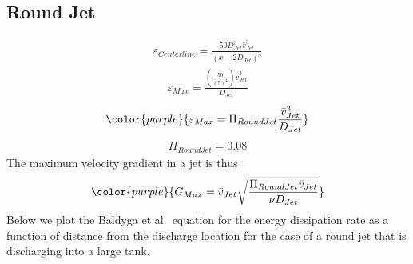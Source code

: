 \documentclass[letterpaper,10pt,english]{sphinxmanual}
\begin{document}
\subsection{Round Jet}
\label{\detokenize{Rapid_Mix/RM_Derivations:round-jet}}\label{\detokenize{Rapid_Mix/RM_Derivations:heading-round-jet}}
\begin{equation}\label{equation:Rapid_Mix/RM_Derivations:Rapid_Mix/RM_Derivations:87}
\begin{split}\varepsilon_{Centerline} = \frac{50 D_{Jet}^3 \bar v_{Jet}^3}{ \left( x - 2 D_{Jet} \right)^4}\end{split}
\end{equation}\begin{equation}\label{equation:Rapid_Mix/RM_Derivations:Rapid_Mix/RM_Derivations:88}
\begin{split}\varepsilon_{Max} = \frac{\left( \frac{50}{\left( 5 \right)^4} \right) \bar v_{Jet}^3}{D_{Jet}}\end{split}
\end{equation}\begin{equation}\label{equation:Rapid_Mix/RM_Derivations:Rapid_Mix/RM_Derivations:89}
\begin{split}\color{purple}{
  \varepsilon_{Max} = \Pi_{RoundJet} \frac{\bar v_{Jet} ^3}{D_{Jet}}
  }\end{split}
\end{equation}\begin{equation}\label{equation:Rapid_Mix/RM_Derivations:Rapid_Mix/RM_Derivations:90}
\begin{split}\Pi_{RoundJet} = 0.08\end{split}
\end{equation}
The maximum velocity gradient in a jet is thus
\begin{equation}\label{equation:Rapid_Mix/RM_Derivations:Rapid_Mix/RM_Derivations:91}
\begin{split}\color{purple}{
  G_{Max} = \bar v_{Jet} \sqrt{\frac{\Pi_{RoundJet} \bar v_{Jet} }{\nu D_{Jet}}}
  }\end{split}
\end{equation}
Below we plot the Baldyga et al. equation for the energy dissipation rate as a function of distance from the discharge location for the case of a round jet that is discharging into a large tank.
\begin{description}
\item[{}] \leavevmode
{}

\end{description}
\end{document}
